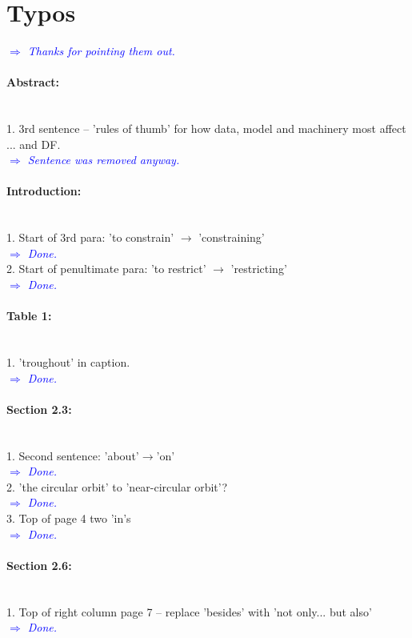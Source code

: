 \documentclass[10pt,a4paper]{article}
\newcommand{\Comment}[1]{\textsl{\textcolor{Blue}{$\Longrightarrow$ {#1}}}}
\begin{document}
\section{Typos}

 \Comment{Thanks for pointing them out.}

\paragraph{Abstract:} \hspace{1cm}\\1. 3rd sentence -- 'rules of thumb' for how data, model and machinery most affect ... and DF. \\\Comment{Sentence was removed anyway.}

\paragraph{Introduction:} \hspace{1cm}\\1. Start of 3rd para: 'to constrain' $\rightarrow$ 'constraining'  \\\Comment{Done.} \\2. Start of penultimate para: 'to restrict' $\rightarrow$ 'restricting' \\\Comment{Done.}

\paragraph{Table 1:} \hspace{1cm}\\1. 'troughout' in caption. \\\Comment{Done.}

\paragraph{Section 2.3:} \hspace{1cm}\\1. Second sentence: 'about'$\rightarrow$'on' \\\Comment{Done.} \\2. 'the circular orbit' to 'near-circular orbit'? \\\Comment{Done.} \\3. Top of page 4 two 'in's \\\Comment{Done.}

\paragraph{Section 2.6:} \hspace{1cm}\\1. Top of right column page 7 -- replace 'besides' with 'not only... but also' \\\Comment{Done.}
\end{document}
